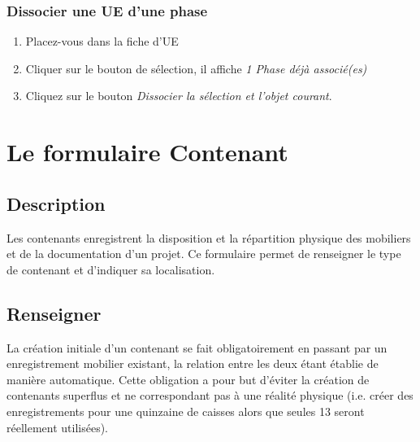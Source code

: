 \documentclass[letterpaper,10pt,french]{sphinxmanual}
\begin{document}
\subsection{Dissocier une UE d'une phase}
\label{manuel/formulaire_datation:dissocier-une-ue-d-une-phase}\begin{enumerate}
\item {} 
Placez-vous dans la fiche d'UE

\item {} 
Cliquer sur le bouton de sélection, il affiche \emph{1 Phase déjà associé(es)}

\item {} 
Cliquez sur le bouton \emph{Dissocier  la sélection et l'objet courant}.

\end{enumerate}


\chapter{Le formulaire Contenant}
\label{manuel/formulaire_contenant:le-formulaire-contenant}\label{manuel/formulaire_contenant::doc}

\section{Description}
\label{manuel/formulaire_contenant:description}
Les contenants enregistrent la disposition et la répartition physique des mobiliers et de la documentation d'un projet. Ce formulaire permet de renseigner le type de contenant et d'indiquer sa localisation.
\begin{figure}[htbp]
\centering

\end{figure}


\section{Renseigner}
\label{manuel/formulaire_contenant:renseigner}
La création initiale d'un contenant se fait obligatoirement en passant par un enregistrement mobilier existant, la relation entre les deux étant établie de manière automatique. Cette obligation a pour but d'éviter la création de contenants superflus et ne correspondant pas à une réalité physique (i.e. créer des enregistrements pour une quinzaine de caisses alors que seules 13 seront réellement utilisées).
\end{document}
